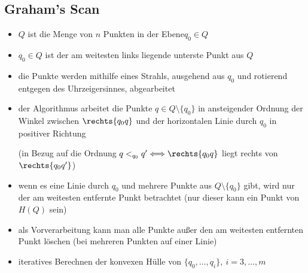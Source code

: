 \subsection{Graham's Scan}
\begin{itemize}[itemsep=0pt]
	\item $Q$ ist die Menge von $n$ Punkten in der Ebene$q_0\in Q$
	\item $q_0\in Q$ ist der am weitesten links liegende unterste Punkt aus $Q$
	\item die Punkte werden mithilfe eines Strahls, ausgehend aus $q_0$ und rotierend entgegen des Uhrzeigersinnes, abgearbeitet
	\item der Algorithmus arbeitet die Punkte $q\in Q\setminus \{q_0\}$ in ansteigender Ordnung der Winkel zwischen $\rechts{q_0q}$ und der horizontalen Linie durch $q_0$ in positiver Richtung 
	\begin{center}(in Bezug auf die Ordnung $q<_{q_0}q' \Longleftrightarrow \rechts{q_0q}$ liegt rechts von $\rechts{q_0q'}$)\end{center}
	\item wenn es eine Linie durch $q_0$ und mehrere Punkte aus $Q\setminus \{q_0\}$ gibt, wird nur der am weitesten entfernte Punkt betrachtet (nur dieser kann ein Punkt von $H(Q)$ sein)
	\item als Vorverarbeitung kann man alle Punkte außer den am weitesten entfernten Punkt löschen (bei mehreren Punkten auf einer Linie)
	\item iteratives Berechnen der konvexen Hülle von $\{q_0,\dots,q_i\},~i=3,\dots,m$
\end{itemize}
\topbreak
\up\up

